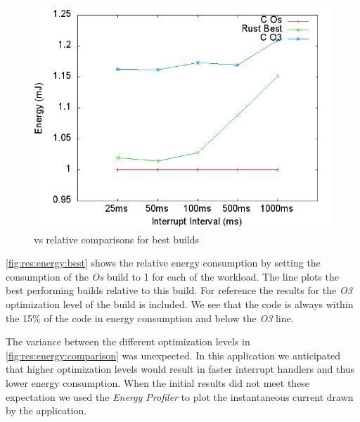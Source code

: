 \begin{figure}[H]
  \includegraphics[width=\textwidth]{results/plots/energy/best.png}
  \caption{{\rust} vs {\C} relative comparisons for best builds}
  \label{fig:res:energy:best}
\end{figure}

\autoref{fig:res:energy:best} shows the relative energy consumption by setting the consumption of the {\C} \emph{Os} build to 1 for each of the workload.
The {\rust} line plots the best performing {\rust} builds relative to this {\C} build.
For reference the results for the \emph{O3} optimization level of the {\C} build is included.
We see that the {\rust} code is always within the 15\% of the {\C} code in energy consumption and below the \emph{O3} line.


The variance between the different optimization levels in \autoref{fig:res:energy:comparison} was unexpected.
In this application we anticipated that higher optimization levels would result in faster interrupt handlers and thus lower energy consumption.
When the initial results did not meet these expectation we used the \emph{Energy Profiler} to plot the instantaneous current drawn by the application.

